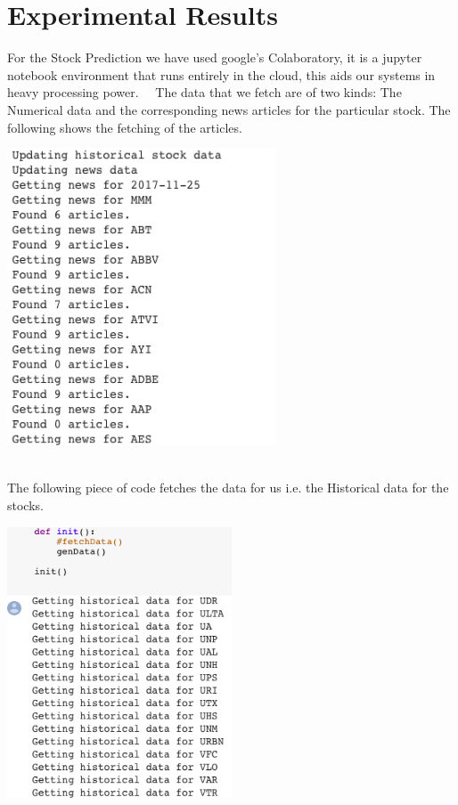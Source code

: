 \documentclass[12pt]{article}
\begin{document}
\section{Experimental Results}
For the Stock Prediction we have used google's Colaboratory, it is a jupyter notebook environment that runs entirely in the cloud, this aids our systems in heavy processing power.
\ \
The data that we fetch are of two kinds: The Numerical data and the corresponding news articles for the particular stock. The following shows the fetching of the articles.
\ \
\begin{center}
\includegraphics[width=0.6\textwidth]{Getting_articles.png}
\end{center}
\\
The following piece of code fetches the data for us i.e. the Historical data for the stocks. 
\\
\begin{center}
\includegraphics[width=0.5\textwidth]{Getting_HSD.png}
\end{center}
\end{document}
